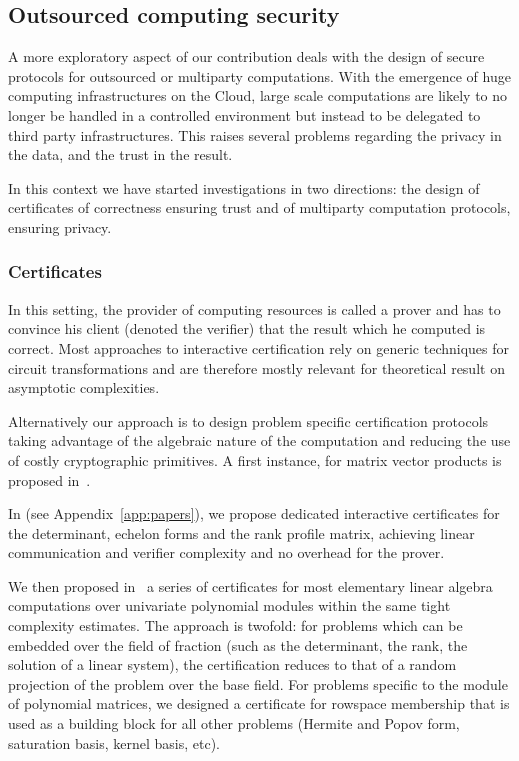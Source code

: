 \documentclass{deliverablereport}
\begin{document}
\subsection{Outsourced computing security}

A more exploratory aspect of our contribution deals with the design of secure
protocols for outsourced or multiparty computations.
With the emergence of huge computing infrastructures on the Cloud, large scale
computations are likely to no longer be handled in a controlled environment but
instead to be delegated to third party infrastructures. This raises several
problems regarding the privacy in the data, and the trust in the result.

In this context we have started investigations in two directions: the design of
certificates of correctness ensuring trust and of multiparty computation
protocols, ensuring privacy.

\subsubsection{Certificates}

In this setting, the provider of computing resources is called a
prover and has to
convince his client (denoted the verifier) that the result which he computed is
correct.
Most approaches to interactive certification rely on generic techniques for
circuit transformations and are therefore mostly relevant for theoretical result
on asymptotic complexities. 

Alternatively our approach is to design problem specific certification protocols
taking advantage of the algebraic nature of the computation and
reducing the use of costly
cryptographic primitives. A first instance, for matrix vector products is
proposed in~\cite{DuZu17}.

In \cite{DLP17} (see Appendix~\ref{app:papers}), we propose dedicated interactive
certificates for the determinant, echelon forms and the rank profile matrix,
achieving linear communication and verifier complexity and no overhead for the prover.

We then proposed in~\cite{LNPRR18}  a series of certificates for most
elementary linear algebra computations over univariate polynomial modules within
the same tight complexity estimates. The approach is twofold: for problems which
can be embedded over the field of fraction (such as the determinant, the rank,
the solution of a linear system), the certification reduces to that of a random
projection of the problem over the base field. For problems specific to the
module of polynomial matrices, we designed a certificate for rowspace membership
that is used as a building block for all other problems (Hermite and Popov form,
saturation basis, kernel basis, etc).
\end{document}
